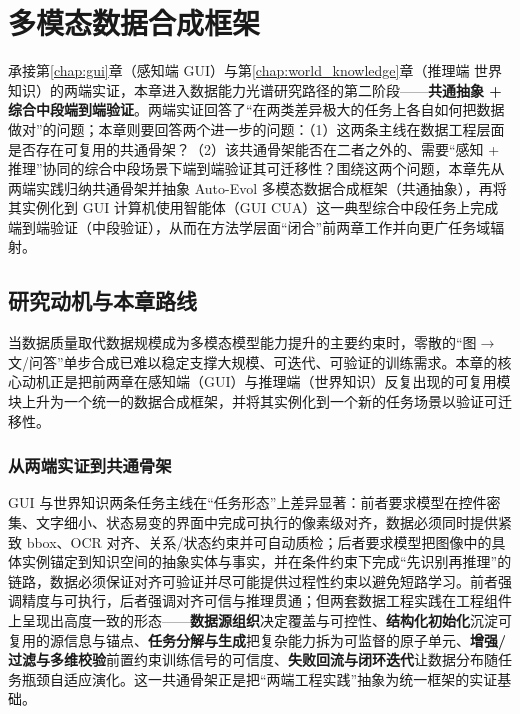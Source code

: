\chapter{多模态数据合成框架}
\label{chap:framework}

承接第\ref{chap:gui}章（感知端 GUI）与第\ref{chap:world_knowledge}章（推理端 世界知识）的两端实证，本章进入数据能力光谱研究路径的第二阶段——\textbf{共通抽象 + 综合中段端到端验证}。两端实证回答了“在两类差异极大的任务上各自如何把数据做对”的问题；本章则要回答两个进一步的问题：（1）这两条主线在数据工程层面是否存在可复用的共通骨架？（2）该共通骨架能否在二者之外的、需要“感知 + 推理”协同的综合中段场景下端到端验证其可迁移性？围绕这两个问题，本章先从两端实践归纳共通骨架并抽象 Auto-Evol 多模态数据合成框架（共通抽象），再将其实例化到 GUI 计算机使用智能体（GUI CUA）这一典型综合中段任务上完成端到端验证（中段验证），从而在方法学层面“闭合”前两章工作并向更广任务域辐射。

\section{研究动机与本章路线}
当数据质量取代数据规模成为多模态模型能力提升的主要约束时，零散的“图$\rightarrow$文/问答”单步合成已难以稳定支撑大规模、可迭代、可验证的训练需求。本章的核心动机正是把前两章在感知端（GUI）与推理端（世界知识）反复出现的可复用模块上升为一个统一的数据合成框架，并将其实例化到一个新的任务场景以验证可迁移性。

\subsection{从两端实证到共通骨架}
GUI 与世界知识两条任务主线在“任务形态”上差异显著：前者要求模型在控件密集、文字细小、状态易变的界面中完成可执行的像素级对齐，数据必须同时提供紧致 bbox、OCR 对齐、关系/状态约束并可自动质检；后者要求模型把图像中的具体实例锚定到知识空间的抽象实体与事实，并在条件约束下完成“先识别再推理”的链路，数据必须保证对齐可验证并尽可能提供过程性约束以避免短路学习。前者强调精度与可执行，后者强调对齐可信与推理贯通；但两套数据工程实践在工程组件上呈现出高度一致的形态——\textbf{数据源组织}决定覆盖与可控性、\textbf{结构化初始化}沉淀可复用的源信息与锚点、\textbf{任务分解与生成}把复杂能力拆为可监督的原子单元、\textbf{增强/过滤与多维校验}前置约束训练信号的可信度、\textbf{失败回流与闭环迭代}让数据分布随任务瓶颈自适应演化。这一共通骨架正是把“两端工程实践”抽象为统一框架的实证基础。


